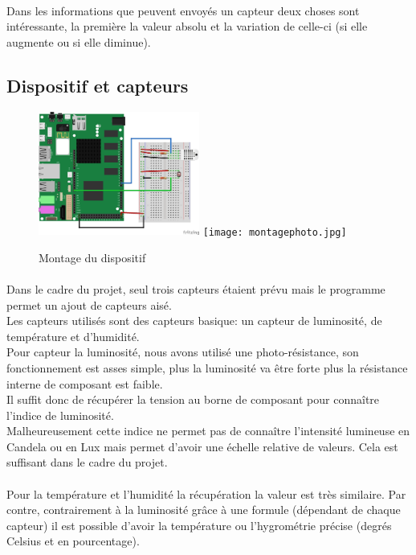 \documentclass[a4paper, titlepage, oneside, 12pt]{article}%
\begin{document}
\paragraph{}
Dans les informations que peuvent envoyés un capteur deux choses sont intéressante, la première la valeur absolu et la variation de celle-ci (si elle augmente ou si elle diminue).
\subsection{Dispositif et capteurs}
\begin{figure}
	\centering
	\includegraphics[width=200px]{montage.jpg}
		\texttt{[image: montagephoto.jpg]}
	\caption{Montage du dispositif}
\end{figure}
\paragraph{}
Dans le cadre du projet, seul trois capteurs étaient prévu mais le programme permet un ajout de capteurs aisé.\\
Les capteurs utilisés sont des capteurs basique: un capteur de luminosité, de température et d'humidité.\\

Pour capteur la luminosité, nous avons utilisé une photo-résistance, son fonctionnement est asses simple, plus la luminosité va être forte plus la résistance interne de composant est faible. \\
Il suffit donc de récupérer la tension au borne de composant pour connaître l'indice de luminosité.\\ 
Malheureusement cette indice ne permet pas de connaître l'intensité lumineuse en Candela ou en Lux mais permet d'avoir une échelle relative de valeurs. Cela est suffisant dans le cadre du projet.
\paragraph{}
Pour la température et l'humidité la récupération la valeur est très similaire. Par contre, contrairement à la luminosité grâce à une formule (dépendant de chaque capteur) il est possible d'avoir la température ou l'hygrométrie précise (degrés Celsius et en pourcentage). 
\end{document}
